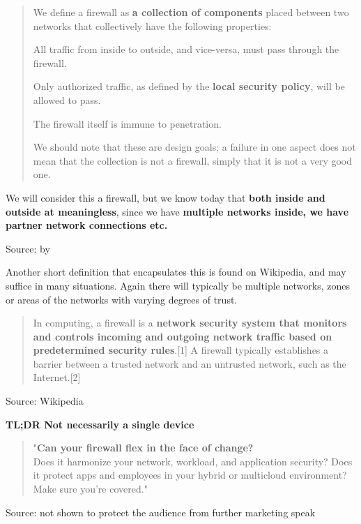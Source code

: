 \documentclass[Screen16to9,17pt]{foils}
\begin{document}

\begin{quote}
We define a firewall as {\bf a collection of components} placed between two networks that collectively have
the following properties:
\begin{list2}
\item All traffic from inside to outside, and vice-versa, must pass through the firewall.
\item Only authorized traffic, as defined by the {\bf local security policy}, will be allowed to pass.
\item The firewall itself is immune to penetration.
\end{list2}
We should note that these are design goals; a failure in one aspect does not mean that the collection
is not a firewall, simply that it is not a very good one.
\end{quote}

We will consider this a firewall, but we know today that {\bf both inside and outside at meaningless}, since we have {\bf multiple networks inside, we have partner network connections etc.}

Source:  by \citeauthor{Cheswick94} \citeyear{Cheswick94}


Another short definition that encapsulates this is found on Wikipedia, and may suffice in many situations. Again there will typically be multiple networks, zones or areas of the networks with varying degrees of trust.
\begin{quote}
In computing, a firewall is a {\bf network security system that monitors and controls incoming and outgoing network traffic based on predetermined security rules}.[1] A firewall typically establishes a barrier between a trusted network and an untrusted network, such as the Internet.[2]
\end{quote}
Source: Wikipedia

{\bf TL;DR Not necessarily a single device}






\begin{quote}
"{\bf Can your firewall flex in the face of change?}\\
Does it harmonize your network, workload, and application security? Does it protect apps and employees in your hybrid or multicloud environment? Make sure you're covered."
\end{quote}
Source: not shown to protect the audience from further marketing speak
\end{document}
